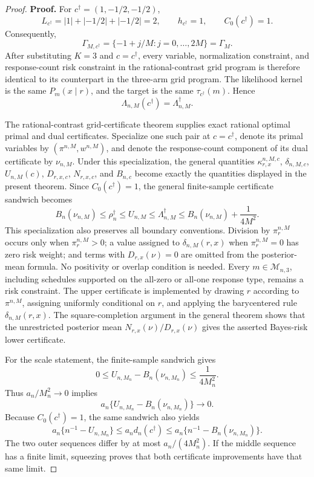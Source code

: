 \documentclass{article}
\begin{document}
\begin{proof}
\textbf{Proof.}
For \(c^\dagger=(1,-1/2,-1/2)\),
\[
 L_{c^\dagger}=|1|+|-1/2|+|-1/2|=2,
 \qquad h_{c^\dagger}=1,
 \qquad C_0(c^\dagger)=1.
\]
Consequently,
\[
 \Gamma_{M,c^\dagger}
 =\{-1+j/M:j=0,\ldots,2M\}
 =\Gamma_M.
\]
After substituting \(K=3\) and \(c=c^\dagger\), every variable, normalization constraint, and response-count risk constraint in the rational-contrast grid program is therefore identical to its counterpart in the three-arm grid program.  The likelihood kernel is the same \(P_m(x\mid r)\), and the target is the same \(\tau_{c^\dagger}(m)\).  Hence
\[
 \Lambda_{n,M}(c^\dagger)=\Lambda_{n,M}^\dagger.
\]

The rational-contrast grid-certificate theorem supplies exact rational optimal primal and dual certificates.  Specialize one such pair at \(c=c^\dagger\), denote its primal variables by \((\pi^{n,M},w^{n,M})\), and denote the response-count component of its dual certificate by \(\nu_{n,M}\).  Under this specialization, the general quantities \(\kappa_{r,x}^{n,M,c}\), \(\delta_{n,M,c}\), \(U_{n,M}(c)\), \(D_{r,x,c}\), \(N_{r,x,c}\), and \(B_{n,c}\) become exactly the quantities displayed in the present theorem.  Since \(C_0(c^\dagger)=1\), the general finite-sample certificate sandwich becomes
\[
 B_n(\nu_{n,M})
 \leq \rho_n^\dagger
 \leq U_{n,M}
 \leq \Lambda_{n,M}^\dagger
 \leq B_n(\nu_{n,M})+\frac{1}{4M^2}.
\]
This specialization also preserves all boundary conventions.  Division by \(\pi_r^{n,M}\) occurs only when \(\pi_r^{n,M}>0\); a value assigned to \(\delta_{n,M}(r,x)\) when \(\pi_r^{n,M}=0\) has zero risk weight; and terms with \(D_{r,x}(\nu)=0\) are omitted from the posterior-mean formula.  No positivity or overlap condition is needed.  Every \(m\in\mathcal M_{n,3}\), including schedules supported on the all-zero or all-one response type, remains a risk constraint.  The upper certificate is implemented by drawing \(r\) according to \(\pi^{n,M}\), assigning uniformly conditional on \(r\), and applying the barycentered rule \(\delta_{n,M}(r,x)\).  The square-completion argument in the general theorem shows that the unrestricted posterior mean \(N_{r,x}(\nu)/D_{r,x}(\nu)\) gives the asserted Bayes-risk lower certificate.

For the scale statement, the finite-sample sandwich gives
\[
 0\leq U_{n,M_n}-B_n(\nu_{n,M_n})
 \leq \frac{1}{4M_n^2}.
\]
Thus \(a_n/M_n^2\to0\) implies
\[
 a_n\{U_{n,M_n}-B_n(\nu_{n,M_n})\}\longrightarrow0.
\]
Because \(C_0(c^\dagger)=1\), the same sandwich also yields
\[
 a_n\{n^{-1}-U_{n,M_n}\}
 \leq a_nd_n(c^\dagger)
 \leq a_n\{n^{-1}-B_n(\nu_{n,M_n})\}.
\]
The two outer sequences differ by at most \(a_n/(4M_n^2)\).  If the middle sequence has a finite limit, squeezing proves that both certificate improvements have that same limit.


\end{proof}
\end{document}
